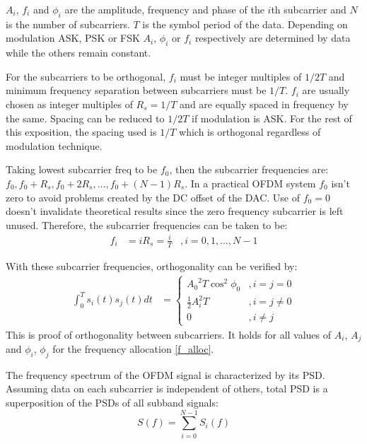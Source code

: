 $A_i$, $f_i$ and $\phi_i$ are the amplitude, frequency and phase of the $i$th \gls{subcarrier} and $N$ is the number of \gls{subcarrier}s. $T$ is the symbol period of the data. Depending on modulation \gls{ASK}, \gls{PSK} or \gls{FSK} $A_i$, $\phi_i$ or $f_i$ respectively are determined by data while the others remain constant.

For the \gls{subcarrier}s to be \gls{orthogonal}, $f_i$ must be integer multiples of $1/2T$ and minimum frequency separation between \gls{subcarrier}s must be $1/T$. $f_i$ are usually chosen as integer multiples of $R_s = 1/T$ and are equally spaced in frequency by the same. Spacing can be reduced to $1/2T$ if modulation is \gls{ASK}\cite{fuqin}. For the rest of this exposition, the spacing used is $1/T$ which is \gls{orthogonal} regardless of modulation technique.

Taking lowest \gls{subcarrier} freq to be $f_0$, then the \gls{subcarrier} frequencies are: $f_0, f_0+R_s, f_0+2R_s,\ldots , f_0 + (N-1)R_s$. In a practical \gls{OFDM} system $f_0$ isn't zero to avoid problems created by the DC offset of the \gls{DAC}. Use of $f_0 = 0$ doesn't invalidate theoretical results since the zero frequency \gls{subcarrier} is left unused\cite{fuqin}. Therefore, the \gls{subcarrier} frequencies can be taken to be:
\begin{align}
	\label{f_alloc}
	f_i &= iR_s = \frac{i}{T}&, i = 0,1,\ldots , N-1
\end{align}

With these \gls{subcarrier} frequencies, \gls{orthogonal}ity can be verified by:\\
\begin{align*}	%
	\int_0^Ts_i(t)s_j(t)dt &= \begin{cases}
	{A_0}^2T\cos^2\phi_0 &, i=j=0\\
	\frac{1}{2}A_i^2T &, i=j\neq 0\\
	0 &, i\neq j
	\end{cases}
\end{align*}
This is proof of \gls{orthogonal}ity between \gls{subcarrier}s\cite{ofdm_intro}. It holds for all values of $A_i$, $A_j$ and $\phi_i$, $\phi_j$ for the frequency allocation \eqref{f_alloc}.

The frequency spectrum of the \gls{OFDM} signal is characterized by its \gls{PSD}. Assuming data on each \gls{subcarrier} is independent of others, total \gls{PSD} is a superposition of the \gls{PSD}s of all \gls{subband} signals\cite{fuqin}:
$$S(f) = \sum_{i=0}^{N-1}S_i(f)$$

